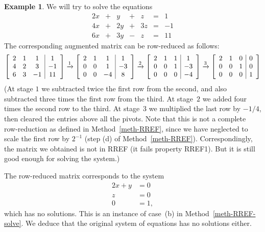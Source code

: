 \documentclass[reqno]{amsart}
\theoremstyle{definition}
\newtheorem{example}[theorem]{Example}
\begin{document}
\begin{example}\label{eg-lineqs-i}
 We will try to solve the equations
 \[
 \begin{array}{rcrcrcr}
 2x & + &  y & + &  z & = &  1  \\
 4x & + & 2y & + & 3z & = & -1  \\
 6x & + & 3y & - &  z & = & 11
 \end{array}
 \]
 The corresponding augmented matrix can be row-reduced as follows:
 \[
 \left[
 \begin{array}{ccc|c}
 2 & 1 & 1 & 1 \\
 4 & 2 & 3 & -1 \\
 6 & 3 & -1 & 11
 \end{array}
 \right] \xrightarrow{1} \left[
 \begin{array}{ccc|c}
 2 & 1 & 1 & 1 \\
 0 & 0 & 1 & -3 \\
 0 & 0 & -4 & 8
 \end{array}
 \right] \xrightarrow{2}
 \left[
 \begin{array}{ccc|c}
 2 & 1 & 1 & 1 \\
 0 & 0 & 1 & -3 \\
 0 & 0 & 0 & -4
 \end{array}
 \right] \xrightarrow{3}
 \left[
 \begin{array}{ccc|c}
 2 & 1 & 0 & 0 \\
 0 & 0 & 1 & 0 \\
 0 & 0 & 0 & 1
 \end{array}
 \right]
 \]
 (At stage $1$ we subtracted twice the first row from the second, and
 also subtracted three times the first row from the third.  At
 stage~$2$ we added four times the second row to the third.  At
 stage~$3$ we multiplied the last row by $-1/4$, then cleared the
 entries above all the pivots.
 Note that this is not a complete row-reduction as defined in
 Method~\ref{meth-RREF}, since we have neglected to scale the first
 row by $2^{-1}$ (step (d) of Method~\ref{meth-RREF}).
 Correspondingly, the matrix we obtained is not in RREF (it fails
 property RREF1).
 But it is still good enough for solving the system.)

 The row-reduced matrix corresponds to the system
 \begin{align*}
  2x + y &= 0 \\
  z &= 0 \\
  0 &= 1,
 \end{align*}
 which has no solutions.  This is an instance of case~(b) in
 Method~\ref{meth-RREF-solve}.  We deduce that the original system of
 equations has no solutions either.


\end{example}
\end{document}
